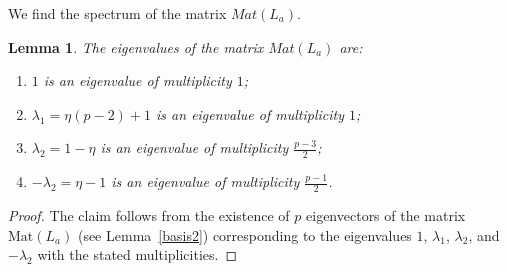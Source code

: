 \documentclass[12pt]{article}
\newtheorem{lem}{Lemma}
\begin{document}
	We find the spectrum of the matrix $Mat(L_{a})$.
	\begin{lem}\label{sv}
The eigenvalues of the matrix $Mat(L_a)$ are:
	\begin{enumerate}
		\item $1$ is an eigenvalue of multiplicity $1$;
		\item $\lambda_1 = \eta(p-2) + 1$ is an eigenvalue of multiplicity $1$;
		\item $\lambda_2 = 1-\eta$ is an eigenvalue of multiplicity $\frac{p-3}{2}$;
		\item $-\lambda_2=\eta-1$ is an eigenvalue of multiplicity $\frac{p-1}{2}$. 
	\end{enumerate}
		
	\end{lem}
\begin{proof}
The claim follows from the existence of $p$ eigenvectors of the matrix $\mathrm{Mat}(L_a)$ (see Lemma~\ref{basis2}) corresponding to the eigenvalues $1$, $\lambda_1$, $\lambda_2$, and $-\lambda_2$ with the stated multiplicities.
\end{proof}
\end{document}
